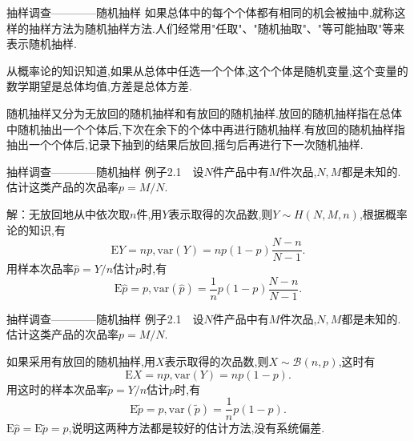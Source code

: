 \begin{frame}{抽样调查————随机抽样}
如果总体中的每个个体都有相同的机会被抽中,就称这样的抽样方法为\alert{随机抽样}方法.人们经常用"\alert{任取}"、"\alert{随机抽取}"、"\alert{等可能抽取}"等来表示随机抽样.

从概率论的知识知道,如果从总体中任选一个个体,这个个体是随机变量,这个变量的数学期望是总体均值,方差是总体方差.

随机抽样又分为无放回的随机抽样和有放回的随机抽样.放回的随机抽样指在总体中随机抽出一个个体后,下次在余下的个体中再进行随机抽样.有放回的随机抽样指抽出一个个体后,记录下抽到的结果后放回,摇匀后再进行下一次随机抽样.
\end{frame}

\begin{frame}{抽样调查————随机抽样}
例子2.1$\quad$设$N$件产品中有$M$件次品,$N,M$都是未知的.估计这类产品的次品率$p=M/N$.

解：无放回地从中依次取$n$件,用$Y$表示取得的次品数,则$Y\sim H(N,M,n)$,根据概率论的知识,有
\begin{equation}
\mathrm{E}Y = np,\mathrm{var}(Y) = np(1-p)\frac{N-n}{N-1}.
\end{equation}
用样本次品率$\hat{p}=Y/n$估计$p$时,有
\begin{equation}
\mathrm{E}\hat{p} = p,\mathrm{var}(\hat{p}) = \frac{1}{n}p(1-p)\frac{N-n}{N-1}.
\end{equation}	
\end{frame}

\begin{frame}{抽样调查————随机抽样}
例子2.1$\quad$设$N$件产品中有$M$件次品,$N,M$都是未知的.估计这类产品的次品率$p=M/N$.

如果采用有放回的随机抽样,用$X$表示取得的次品数,则$X\sim\mathcal{B}(n,p)$,这时有
\begin{equation}
\mathrm{E}X = np,\mathrm{var}(Y) = np(1-p).
\end{equation}
用这时的样本次品率$\tilde{p}=Y/n$估计$p$时,有
\begin{equation}
\mathrm{E}\tilde{p} = p,\mathrm{var}(\tilde{p}) = \frac{1}{n}p(1-p).
\end{equation}	
$\mathrm{E}\hat{p} = \mathrm{E}\tilde{p} = p$,说明这两种方法都是较好的估计方法,没有系统偏差.
\end{frame}

